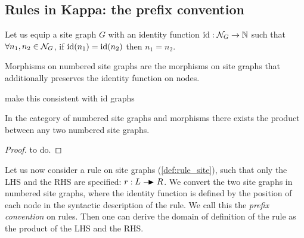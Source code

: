 \subsection{Rules in Kappa: the prefix convention}
\label{app:prefix_convention}

\begin{definition}
  Let us equip a site graph $G$ with an identity function $\text{id}:\mathcal{N}_G\to \mathbb{N}$ such that $\forall n_1, n_2\in\mathcal{N}_G$, if $\text{id}(n_1)=\text{id}(n_2)$ then $n_1 = n_2$.

  Morphisms on numbered site graphs are the morphisms on site graphs that additionally preserves the identity function on nodes.
\end{definition}

\begin{mdframed}[backgroundcolor=blue!20]
make this consistent with id graphs
\end{mdframed}


\begin{lemma}
  In the category of numbered site graphs and morphisms there exists the product between any two numbered site graphs.
\end{lemma}
\begin{proof}
  to do.
\end{proof}

Let us now consider a rule on site graphs (\autoref{def:rule_site}), such that only the LHS and the RHS are specified: $r:L\action R$. We convert the two site graphs in numbered site graphs, where the identity function is defined by the position of each node in the syntactic description of the rule. We call this the \emph{prefix convention} on rules. Then one can derive the domain of definition of the rule as the product of the LHS and the RHS.
